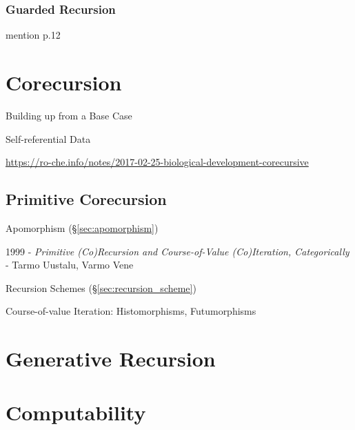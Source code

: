 \subsubsection{Guarded Recursion}\label{sec:guarded_recursion}

mention \cite{abramsky-gay-nagarajan96} p.12

\cite{atkey-mcbride13}



\section{Corecursion}\label{sec:corecursion}

Building up from a Base Case

Self-referential Data

\url{https://ro-che.info/notes/2017-02-25-biological-development-corecursive}



\subsection{Primitive Corecursion}\label{sec:primitive_corecursion}

Apomorphism (\S\ref{sec:apomorphism})

1999 - \emph{Primitive (Co)Recursion and Course-of-Value (Co)Iteration,
  Categorically} - Tarmo Uustalu, Varmo Vene

Recursion Schemes (\S\ref{sec:recursion_scheme})

Course-of-value Iteration: Histomorphisms, Futumorphisms



\section{Generative Recursion}\label{sec:generative_recursion}

\section{Computability}\label{sec:computability}

